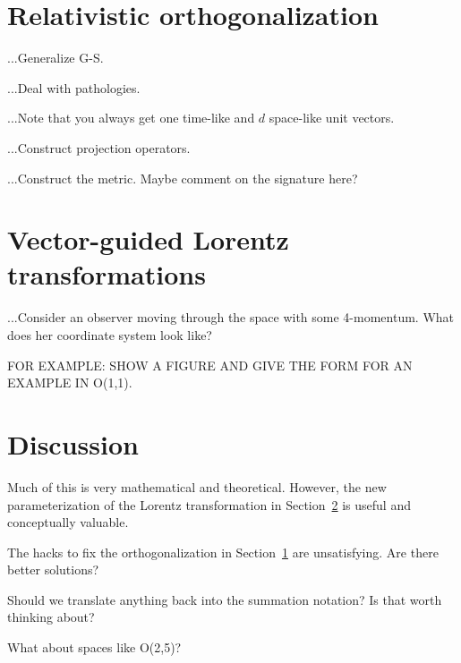 \documentclass{article}
\newcommand{\secref}[1]{Section~\ref{#1}}
\begin{document}
\section{Relativistic orthogonalization}\label{sec:orth}

...Generalize G-S.

...Deal with pathologies.

...Note that you always get one time-like and $d$ space-like unit vectors.

...Construct projection operators.

...Construct the metric. Maybe comment on the signature here?

\section{Vector-guided Lorentz transformations}\label{sec:lt}

...Consider an observer moving through the space with some 4-momentum. What does her coordinate system look like?

FOR EXAMPLE: SHOW A FIGURE AND GIVE THE FORM FOR AN EXAMPLE IN O(1,1).

\section{Discussion}\label{sec:discussion}

Much of this is very mathematical and theoretical.
However, the new parameterization of the Lorentz transformation in \secref{sec:lt} is useful and conceptually valuable.

The hacks to fix the orthogonalization in \secref{sec:orth} are unsatisfying. Are there better solutions?

Should we translate anything back into the summation notation? Is that worth thinking about?

What about spaces like O(2,5)?

\raggedright
\printbibliography
\end{document}
